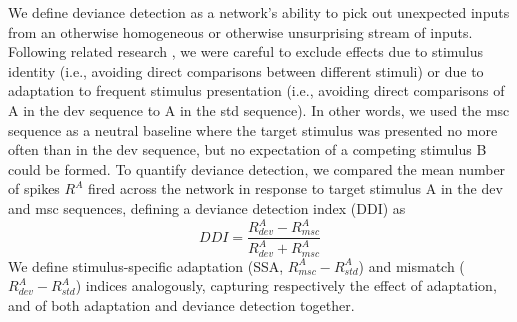 \documentclass[pdflatex,referee,iicol,sn-basic]{sn-jnl}
\theoremstyle{thmstyleone}%
\theoremstyle{thmstyletwo}%
\theoremstyle{thmstylethree}%
\begin{document}
We define deviance detection as a network's ability to pick out unexpected inputs from an otherwise homogeneous or otherwise unsurprising stream of inputs. Following related research \citep{Kubota2021-dx,Harms2014-ah,Jacobsen2001-sc}, we were careful to exclude effects due to stimulus identity (i.e., avoiding direct comparisons between different stimuli) or due to adaptation to frequent stimulus presentation (i.e., avoiding direct comparisons of A in the dev sequence to A in the std sequence). In other words, we used the msc sequence as a neutral baseline where the target stimulus was presented no more often than in the dev sequence, but no expectation of a competing stimulus B could be formed. To quantify deviance detection, we compared the mean number of spikes $R^A$ fired across the network in response to target stimulus A in the dev and msc sequences, defining a deviance detection index (DDI) as
\begin{equation}
    DDI = \frac{R^A_{dev} - R^A_{msc}}{R^A_{dev} + R^A_{msc}} \label{eqn-ddi}
\end{equation}
We define stimulus-specific adaptation (SSA, $R^A_{msc} - R^A_{std}$) and mismatch ($R^A_{dev} - R^A_{std}$) indices analogously, capturing respectively the effect of adaptation, and of both adaptation and deviance detection together.


\end{document}
